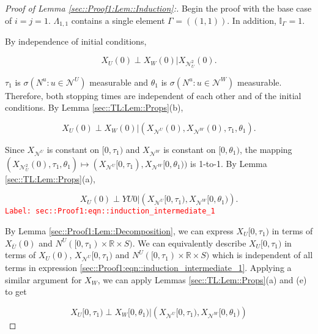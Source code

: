 \documentclass[12pt]{article}
\newcommand{\mb}{\mathbb}
\newcommand{\mc}{\mathcal}
\newcommand{\ov}{\overline}
\newcommand{\tr}{\textcolor{red}}
\newcommand{\labe}[1]{\tr{\texttt{Label: #1}}}
\newcommand{\vv}{u}								%
\renewcommand{\U}{U}							%
\newcommand{\UU}{W}								%
\renewcommand{\S}{S}							%
\newcommand{\X}{X}								%
\newcommand{\neigh}{\mc{N}}						%
\newcommand{\dneigh}{\mc{N}^2}					%
\newcommand{\vind}[1]{^{#1}}					%
\newcommand{\cind}[1]{_{#1}}					%
\newcommand{\cl}{\ov}							%
\newcommand{\tp}[1]{(#1)}						%
\newcommand{\tip}[1]{#1}						%
\newcommand{\poiss}{N}							%
\newcommand{\indx}[1]{_{#1}}					%
\newcommand{\dnvind}[1]{_{#1}}					%
\newcommand{\XX}{Y}								%
\newcommand{\rt}{\tau}							%
\newcommand{\rtt}{\theta}						%
\newcommand{\apath}{\Gamma}						%
\newcommand{\pathset}[2]{\Lambda_{#1,#2}}		%
\begin{document}
\begin{proof}[Proof of Lemma \ref{sec::Proof1:Lem::Induction}:]
Begin the proof with the base case of \(i=j =1\). \(\pathset{1}{1}\) contains a single element \(\apath\indx{} = ((1,1))\). In addition, \(\mb{I}_{\apath\indx{}} = 1\).

By independence of initial conditions,

\[\X\cind{\U}\tp{0}\perp \X\cind{\UU}\tp{0}|\X\cind{\dneigh\dnvind{\U}}\tp{0}.\]

\(\rt\indx{1}\) is \(\sigma\left(\poiss\vind{\vv}:\vv\in \neigh\vind{\U}\right)\) measurable and \(\rtt\indx{1}\) is \(\sigma\left(\poiss\vind{\vv}:\vv\in \neigh\vind{\UU}\right)\) measurable. Therefore, both stopping times are independent of each other and of the initial conditions. By Lemma \ref{sec::TL:Lem::Props}(b), 

\[\X\cind{\U}\tp{0}\perp \X\cind{\UU}\tp{0}|\left(\X\cind{\neigh\vind{\U}}\tp{0},\X\cind{\neigh\vind{\UU}}\tp{0},\rt\indx{1},\rtt\indx{1}\right).\]

Since \(\X\cind{\neigh\vind{\U}}\tip{}\) is constant on \([0,\rt\indx{1})\) and \(\X\cind{\neigh\vind{\UU}}\tip{}\) is constant on \([0,\rtt\indx{1})\), the mapping \((\X\cind{\dneigh\dnvind{\U}}\tp{0},\rt\indx{1},\rtt\indx{1}) \mapsto (\X\cind{\neigh\vind{\U}}\tip{[0,\rt\indx{1})},\X\cind{\neigh\vind{\UU}}\tip{[0,\rtt\indx{1})})\) is 1-to-1. By Lemma \ref{sec::TL:Lem::Props}(a),

\begin{equation}
\X\cind{\U}\tp{0}\perp \XX{\U}{0}|\left(\X\cind{\neigh\vind{\U}}\tip{[0,\rt\indx{1})},\X\cind{\neigh\vind{\UU}}\tip{[0,\rtt\indx{1})}\right).
\label{sec::Proof1:eqn::induction_intermediate_1}
\end{equation}
\labe{sec::Proof1:eqn::induction\_intermediate\_1}

By Lemma \ref{sec::Proof1:Lem::Decomposition}, we can express \(\X\cind{\U}\tip{[0,\rt\indx{1})}\) in terms of \(\X\cind{\cl{\U}}\tp{0}\) and \(\poiss\vind{\U}([0,\rt\indx{1})\times\mb{R}\times\S)\). We can equivalently describe \(\X\cind{\U}\tip{[0,\rt\indx{1})}\) in terms of \(\X\cind{\U}\tp{0}\), \(\X\cind{\neigh\vind{\U}}\tip{[0,\rt\indx{1})}\) and \(\poiss\vind{\U}([0,\rt\indx{1})\times \mb{R}\times \S)\) which is independent of all terms in expression \eqref{sec::Proof1:eqn::induction_intermediate_1}. Applying a similar argument for \(\X\cind{\UU}\tip{}\), we can apply Lemmas \ref{sec::TL:Lem::Props}(a) and (e) to get

\[\X\cind{\U}\tip{[0,\rt\indx{1})}\perp \X\cind{\UU}\tip{[0,\rtt\indx{1})}|\left(\X\cind{\neigh\vind{\U}}\tip{[0,\rt\indx{1})},\X\cind{\neigh\vind{\UU}}\tip{[0,\rtt\indx{1})}\right)\]


\end{proof}
\end{document}

